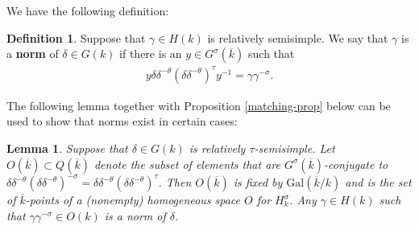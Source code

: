 \documentclass[12pt]{amsart}
\newtheorem{lem}[thm]{Lemma}
\theoremstyle{remark}
\numberwithin{equation}{section}
\newcommand{\Gal}{\mathrm{Gal}}
\theoremstyle{definition}
\newtheorem{defn}[thm]{Definition}
\renewcommand{\bar}{\overline}
\numberwithin{equation}{subsection}
\begin{document}
We have the following definition:

\begin{defn} \label{defn-norm} Suppose that $\gamma \in H(k)$ is relatively semisimple.
We say that $\gamma$ is a \textbf{norm} of $\delta \in G(k)$ if there is an $y \in G^{\sigma}(\bar{k})$ such that
\begin{align*}
y\delta\delta^{-\theta}(\delta\delta^{-\theta})^{\tau} y^{-1}=
\gamma\gamma^{-\sigma}.
\end{align*}

\end{defn}


The following lemma together with Proposition \ref{matching-prop} below can be used to show that norms exist in certain cases:

\begin{lem} \label{lem-geom-norm}   Suppose that $\delta \in G(k)$
is relatively $\tau$-semisimple.
  Let $O(\bar{k}) \subset Q(\bar{k})$ denote the subset of elements that are $G^{\sigma}(\bar{k})$-conjugate
to $\delta \delta^{-\theta}(\delta \delta^{-\theta})^{-\sigma}=\delta \delta^{-\theta}(\delta \delta^{-\theta})^{\tau}$.  Then $O(\bar{k})$ is fixed by $\Gal(\bar{k}/k)$ and is the set of
$\bar{k}$-points of a (nonempty) homogeneous space $O$ for $H^{\sigma}_{k}$.  Any $\gamma \in H(k)$ such that $\gamma \gamma^{-\sigma} \in O(k)$ is a norm of $\delta$.
\end{lem}
\end{document}
